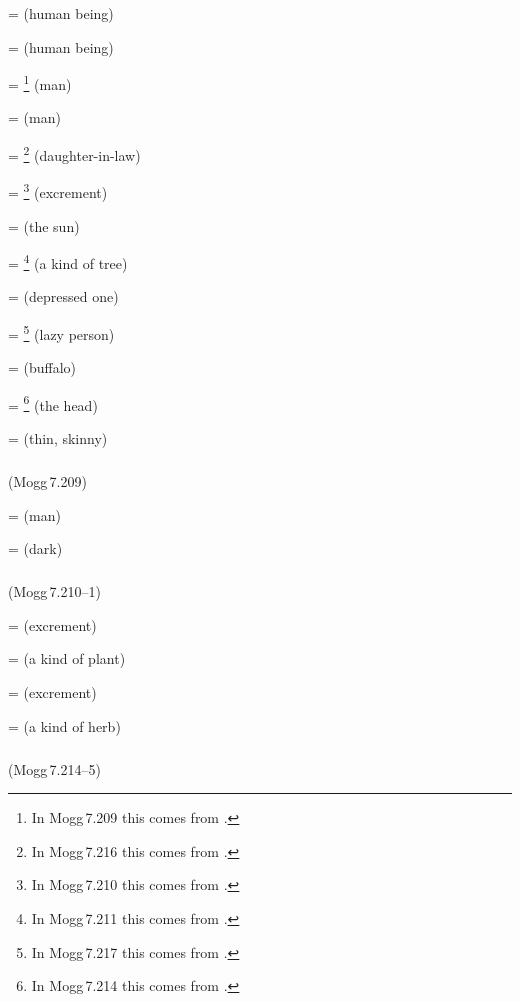  =  (human being)\par
{} =  (human being)\par
{} = \footnote{In Mogg\,7.209 this comes from .} (man)\par
{} =  (man)\par
{} = \footnote{In Mogg\,7.216 this comes from .} (daughter-in-law)\par
{} = \footnote{In Mogg\,7.210 this comes from .} (excrement)\par
{} =  (the sun)\par
{} = \footnote{In Mogg\,7.211 this comes from .} (a kind of tree)\par
{} =  (depressed one)\par
{} = \footnote{In Mogg\,7.217 this comes from .} (lazy person)\par
{} =  (buffalo)\par
{} = \footnote{In Mogg\,7.214 this comes from .} (the head)\par
{} =  (thin, skinny)\par

\subparagraph*{} (Mogg\,7.209)\label{pacckx:kisa}

 =  (man)\par
{} =  (dark)\par

\subparagraph*{} (Mogg\,7.210--1)\label{pacckx:iisa}

 =  (excrement)\par
{} =  (a kind of plant)\par
{} =  (excrement)\par
{} =  (a kind of herb)\par

\subparagraph*{} (Mogg\,7.214--5)\label{pacckx:saka2}

